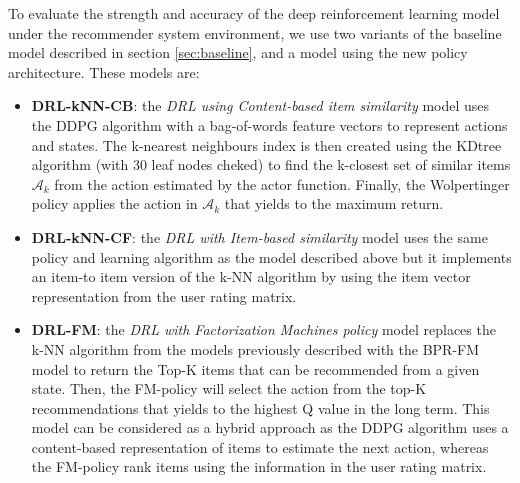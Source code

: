 To evaluate the strength and accuracy of the deep reinforcement learning model under the recommender system environment, we use two variants of the baseline model described in section \ref{sec:baseline}, and a model using the new policy architecture. These models are:

\begin{itemize}
\item \textbf{DRL-kNN-CB}: the \textit{DRL using Content-based item similarity} model uses the DDPG algorithm with a bag-of-words feature vectors to represent actions and states. The k-nearest neighbours index is then created using the KDtree algorithm \cite{friedman1977algorithm} (with 30 leaf nodes cheked) to find the k-closest set of similar items $\mathcal{A}_k$ from the action estimated by the actor function. Finally, the Wolpertinger policy applies the action in $\mathcal{A}_k$ that yields to the maximum return.
\item \textbf{DRL-kNN-CF}: the \textit{DRL with Item-based similarity} model uses the same policy and learning algorithm as the model described above but it implements an item-to item version of the k-NN algorithm by using the item vector representation from the user rating matrix.
\item \textbf{DRL-FM}: the \textit{DRL with Factorization Machines policy} model replaces the k-NN algorithm from the models previously described with the BPR-FM model to return the Top-K items that can be recommended from a given state. Then, the FM-policy will select the action from the top-K recommendations that yields to the highest Q value in the long term. This model can be considered as a hybrid approach as the DDPG algorithm uses a content-based representation of items to estimate the next action, whereas the FM-policy rank items using the information in the user rating matrix.
\end{itemize}
%

